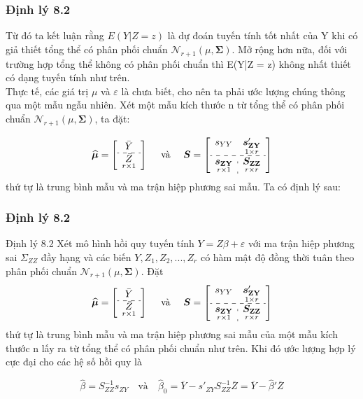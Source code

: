\begin{frame}
\frametitle{Định lý 8.2}
Từ đó ta kết luận rằng $E(Y|Z = z)$ là dự đoán tuyến tính tốt nhất 
của Y khi có giả thiết tổng thể có phân phối chuẩn $\mathcal{N}_{r+1}(\mu, \boldsymbol{\Sigma})$.
Mở rộng hơn nữa, đối với trường hợp tổng thể không có phân phối chuẩn thì
E(Y|Z = z) không nhất thiết có dạng tuyến tính như trên.
\\
Thực tế, các giá trị $\mu$ và $\varepsilon$ là chưa biết, cho nên ta phải ước lượng chúng thông qua một mẫu ngẫu
nhiên.
Xét một mẫu kích thước n từ tổng thể có phân phối chuẩn $\mathcal{N}_{r+1}(\mu, \boldsymbol{\Sigma})$, ta đặt:

$$
\widehat{\boldsymbol{\mu}}=\left[\begin{array}{c}
\bar{Y} \\
\hdashline \underset{r \times 1}{\bar{Z}}
\end{array}\right] \quad \text { và } \quad \boldsymbol{S}=\left[\begin{array}{c:c}
s_{Y Y} & \underset{1 \times r}{\boldsymbol{s}_{\mathbf{Z Y}}^{\prime}} \\
\hdashline \underset{r \times 1}{\boldsymbol{s}_{\mathbf{Z Y}}} & \underset{r \times r}{\boldsymbol{S}_{\mathbf{Z Z}}} 
\end{array}\right]
$$
thứ tự là trung bình mẫu và ma trận hiệp phương sai mẫu.
Ta có định lý sau:

\end{frame}
\begin{frame}
\frametitle{Định lý 8.2}
    

\begin{block}{Định lý 8.2}
    Xét mô hình hồi quy tuyến tính $Y = Z\beta +\varepsilon$ với ma trận hiệp phương sai $\Sigma_{ZZ}$ đầy hạng và các biến
$Y,Z_1,Z_2,...,Z_r$ có hàm mật độ đồng thời tuân theo phân phối chuẩn $\mathcal{N}_{r+1}(\mu, \boldsymbol{\Sigma})$.
Đặt
$$
\widehat{\boldsymbol{\mu}}=\left[\begin{array}{c}
\bar{Y} \\
\hdashline \underset{r \times 1}{\bar{Z}}
\end{array}\right] \quad \text { và } \quad \boldsymbol{S}=\left[\begin{array}{c:c}
s_{Y Y} & \underset{1 \times r}{\boldsymbol{s}_{\mathbf{Z Y}}^{\prime}} \\
\hdashline \underset{r \times 1}{\boldsymbol{s}_{\mathbf{Z Y}}} & \underset{r \times r}{\boldsymbol{S}_{\mathbf{Z Z}}} 
\end{array}\right]
$$
thứ tự là trung bình mẫu và ma trận hiệp phương sai mẫu của một mẫu kích thước n lấy ra từ tổng
thể có phân phối chuẩn như trên.
Khi đó ước lượng hợp lý cực đại cho các hệ số hồi quy là

\begin{footnotesize}
        \[
        \widehat{\beta} = S_{ZZ}^{-1} s_{ZY} \quad \text{và} \quad \hat{\beta}_0 = \overline{Y} - s'_{ZY} S_{ZZ}^{-1} \overline{Z} = \overline{Y} - \widehat{\beta}' \overline{Z}
        \]
    \end{footnotesize}

\end{block}
    
\end{frame}
